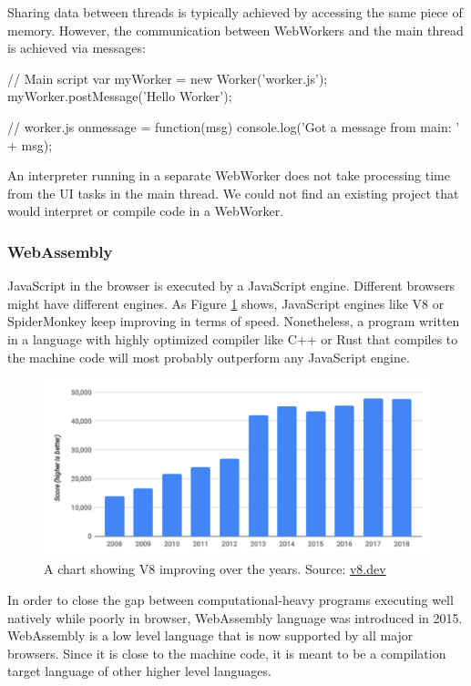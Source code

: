 Sharing data between threads is typically achieved by accessing the same piece of memory. However, the communication between WebWorkers and the main
thread is achieved via messages:
\begin{code}
// Main script
var myWorker = new Worker('worker.js');
myWorker.postMessage('Hello Worker');

// worker.js
onmessage = function(msg) {
  console.log('Got a message from main: ' + msg);
}
\end{code}

An interpreter running in a separate WebWorker does not take processing time from the UI tasks in the main thread. We could not find an existing
project that would interpret or compile code in a WebWorker.

\subsubsection{WebAssembly}
JavaScript in the browser is executed by a JavaScript engine. Different browsers might have different engines. As Figure \ref{fig:chap2:v8_bench} shows,
JavaScript engines like V8 or SpiderMonkey keep improving in terms of speed. Nonetheless, a program written in a language
with highly optimized compiler like C++ or Rust that compiles to the machine code will most probably outperform any JavaScript engine.

\begin{figure}[!hbt]
	\includegraphics[width=\textwidth]{../img/v8-bench}
	\caption{A chart showing V8 improving over the years. Source: \href{https://v8.dev/blog/10-years}{v8.dev}}
	\label{fig:chap2:v8_bench}
\end{figure}

In order to close the gap between computational-heavy programs executing well natively while poorly in browser, WebAssembly
language was introduced in 2015. WebAssembly is a low level language that is now supported by all major browsers. Since it is
close to the machine code, it is meant to be a compilation target language of other higher level languages.

